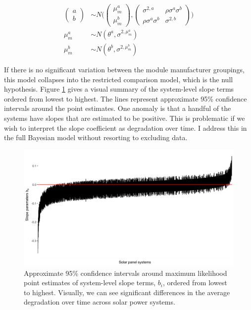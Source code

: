 \documentclass[a4paper]{article}
\begin{document}
\begin{equation}
\begin{aligned}
\begin{pmatrix}
  a\\
  b
\end{pmatrix}
&\sim N \Bigg(
\begin{pmatrix}
  \mu^a_m\\
  \mu^b_m
\end{pmatrix},
\begin{pmatrix}
  \sigma^{2,a} & \rho \sigma^{a} \sigma^{b} \\
  \rho \sigma^a \sigma^b & \sigma^{2,b}
\end{pmatrix} \Bigg) \\
\mu^a_m &\sim N(\theta^a, \sigma^{2, \mu^a_m}) \\
\mu^b_m & \sim N(\theta^b, \sigma^{2, \mu^b_m}) \label{eqn:unrest}
\end{aligned}
\end{equation}

If there is no significant variation between the module manufacturer groupings, this model collapses into the restricted comparison model, which is the null hypothesis. Figure \ref{sfig:sys_slope_fig} gives a visual summary of the system-level slope terms ordered from lowest to highest. The lines represent approximate 95\% confidence intervals around the point estimates. One anomaly is that a handful of the systems have slopes that are estimated to be positive. This is problematic if we wish to interpret the slope coefficient as degradation over time. I address this in the full Bayesian model without resorting to excluding data.

\begin{figure}
  \caption{Approximate 95\% confidence intervals around maximum likelihood point estimates of system-level slope terms, $b_i$, ordered from lowest to highest. Visually, we can see significant differences in the average degradation over time across solar power systems. \label{sfig:sys_slope_fig}}
  \includegraphics[width=1\linewidth]{figures/sys_slope_fig.png}

\end{figure}
\end{document}
